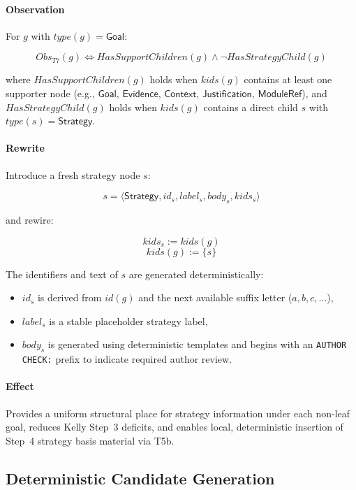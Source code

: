 \documentclass[12pt,twoside,a4paper]{article}
\begin{document}
\paragraph{Observation}

For $g$ with $type(g)=\mathsf{Goal}$:

\[
Obs_{T7}(g) \iff HasSupportChildren(g) \wedge \neg HasStrategyChild(g)
\]

where $HasSupportChildren(g)$ holds when $kids(g)$ contains at least one supporter node (e.g., $\mathsf{Goal}$, $\mathsf{Evidence}$, $\mathsf{Context}$, $\mathsf{Justification}$, $\mathsf{ModuleRef}$), and $HasStrategyChild(g)$ holds when $kids(g)$ contains a direct child $s$ with $type(s)=\mathsf{Strategy}$.

\paragraph{Rewrite}

Introduce a fresh strategy node $s$:

\[
s = \langle \mathsf{Strategy}, id_s, label_s, body_s, kids_s \rangle
\]

and rewire:

\[
kids_s := kids(g)
\]
\[
kids(g) := \{s\}
\]

The identifiers and text of $s$ are generated deterministically:
\begin{itemize}
  \item $id_s$ is derived from $id(g)$ and the next available suffix letter ($a,b,c,\dots$),
  \item $label_s$ is a stable placeholder strategy label,
  \item $body_s$ is generated using deterministic templates and begins with an \texttt{AUTHOR CHECK:} prefix to indicate required author review.
\end{itemize}

\paragraph{Effect}
Provides a uniform structural place for strategy information under each non-leaf goal, reduces Kelly Step~3 deficits, and enables local, deterministic insertion of Step~4 strategy basis material via T5b.

\subsection{Deterministic Candidate Generation}
\end{document}
